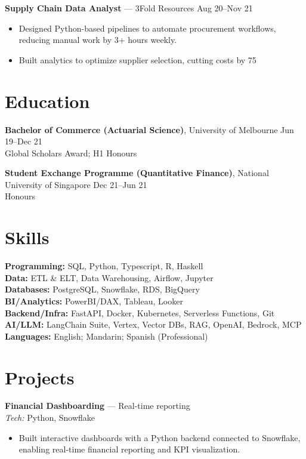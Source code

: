 \documentclass[10pt,letterpaper]{article}
\begin{document}
\textbf{Supply Chain Data Analyst} — 3Fold Resources \hfill Aug 20--Nov 21\\
\begin{itemize}
  \item Designed Python-based pipelines to automate procurement workflows, reducing manual work by 3+ hours weekly.
  \item Built analytics to optimize supplier selection, cutting costs by 75%
\end{itemize}

\section*{Education}

\textbf{Bachelor of Commerce (Actuarial Science)}, University of Melbourne \hfill Jun 19--Dec 21\\
Global Scholars Award; H1 Honours

\textbf{Student Exchange Programme (Quantitative Finance)}, National University of Singapore \hfill Dec 21--Jun 21\\
Honours

\section*{Skills}

\textbf{Programming:} SQL, Python, Typescript, R, Haskell\\
\textbf{Data:} ETL \& ELT, Data Warehousing, Airflow, Jupyter\\
\textbf{Databases:} PostgreSQL, Snowflake, RDS, BigQuery\\
\textbf{BI/Analytics:} PowerBI/DAX, Tableau, Looker\\
\textbf{Backend/Infra:} FastAPI, Docker, Kubernetes, Serverless Functions, Git\\
\textbf{AI/LLM:} LangChain Suite, Vertex, Vector DBs, RAG, OpenAI, Bedrock, MCP\\
\textbf{Languages:} English; Mandarin; Spanish (Professional)

\section*{Projects}

\textbf{Financial Dashboarding} — Real-time reporting \hfill \\
\emph{Tech:} Python, Snowflake\\
\begin{itemize}
  \item Built interactive dashboards with a Python backend connected to Snowflake, enabling real-time financial reporting and KPI visualization.
\end{itemize}
\end{document}
